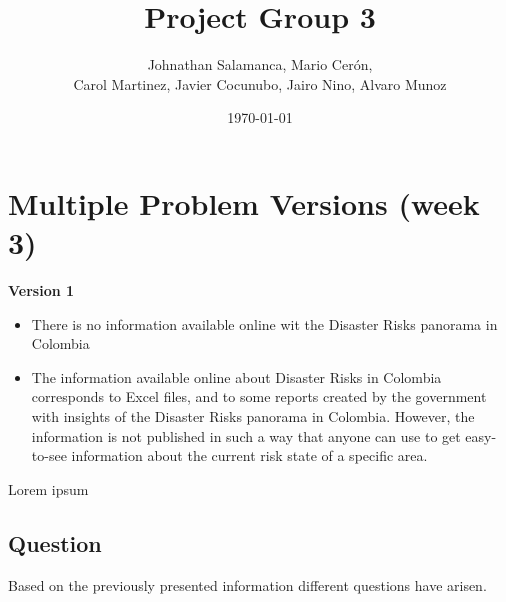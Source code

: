\documentclass[11pt]{article}
\title{Project Group 3}
\author{ Johnathan Salamanca, Mario Cer\'{o}n, \\
Carol Martinez, Javier Cocunubo, Jairo Nino, Alvaro Munoz
 }
\date{\today}
\begin{document}
\maketitle







\section{Multiple Problem Versions (week 3)}
\label{sec:app}
\textbf{Version 1}

\begin{itemize}
\item{There is no information available online wit the Disaster Risks panorama in Colombia}
\item{The information available online about Disaster Risks in Colombia corresponds to Excel files, and to some reports created by the government with insights of the Disaster Risks panorama in Colombia. However, the information is not published in such a way that anyone can use to get easy-to-see information about the current risk state of a specific area. }
\end{itemize}
Lorem ipsum 

\subsection{Question}

Based on the previously presented information different questions have arisen.
\end{document}
